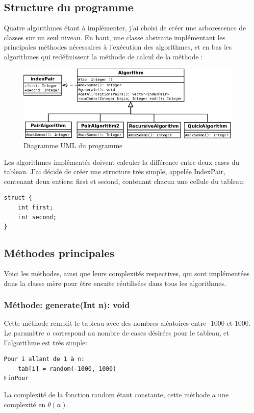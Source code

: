 \documentclass[a4paper, 12pt]{article}
\begin{document}
\subsection{Structure du programme}
Quatre algorithmes étant à implémenter, j'ai choisi de créer une arborescence de classes sur un seul niveau. En haut, une classe abstraite implémentant les principales méthodes nécessaires à l’exécution des algorithmes, et en bas les algorithmes qui redéfinissent la méthode de calcul de la méthode :

\begin{figure}[h]
	\centering
	\includegraphics[scale=0.3]{diagramme.png}
	\caption{Diagramme UML du programme}
	\label{uml}	
\end{figure}

 
Les algorithmes implémentés doivent calculer la différence entre deux cases du tableau. J'ai décidé de créer une structure très simple, appelée IndexPair, contenant deux entiers: first et second, contenant chacun une cellule du tableau:
\begin{verbatim}
struct {
    int first;
    int second;
}
\end{verbatim}

\subsection{Méthodes principales}
Voici les méthodes, ainsi que leurs complexités respectives, qui sont implémentées dans la classe mère pour être ensuite réutilisées dans tous les algorithmes.
\subsubsection{Méthode: generate(Int n): void}
Cette méthode remplit le tableau avec des nombres aléatoires entre -1000 et 1000. Le paramètre $n$ correspond au nombre de cases désirées pour le tableau, et l'algorithme est très simple:
\begin{verbatim}
Pour i allant de 1 à n:
    tab[i] = random(-1000, 1000)
FinPour
\end{verbatim}
La complexité de la fonction random étant constante, cette méthode a une complexité en $\theta (n)$.
\end{document}
